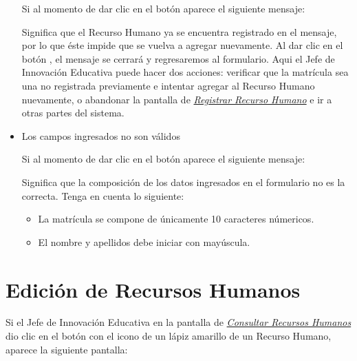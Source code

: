 \begin{itemize}
                	Si al momento de dar clic en el botón  aparece el siguiente mensaje:
            
                	Significa que el Recurso Humano ya se encuentra registrado en el mensaje, por lo que éste impide que se vuelva a agregar nuevamente. Al dar clic en el botón , el mensaje se cerrará y regresaremos al formulario. Aqui el Jefe de Innovación Educativa puede hacer dos acciones: verificar que la matrícula sea una no registrada previamente e intentar agregar al Recurso Humano nuevamente, o abandonar la pantalla de \hyperlink{registrarrh}{\textit{Registrar Recurso Humano}} e ir a otras partes del sistema.
            
            	\item Los campos ingresados no son válidos
    
                	Si al momento de dar clic en el botón  aparece el siguiente mensaje:
            
                	Significa que la composición de los datos ingresados en el formulario no es la correcta. Tenga en cuenta lo siguiente:
            
                	\begin{itemize}
                		\item La matrícula se compone de únicamente 10 caracteres númericos.
                		\item El nombre y apellidos debe iniciar con mayúscula.
                	\end{itemize}
            
            \end{itemize}

\newpage
    \section{Edición de Recursos Humanos}
        Si el Jefe de Innovación Educativa en la pantalla de \hyperlink{consultarrh}{\textit{Consultar Recursos Humanos}} dio clic en el botón con el icono de un lápiz amarillo de un Recurso Humano, aparece la siguiente pantalla:
        
